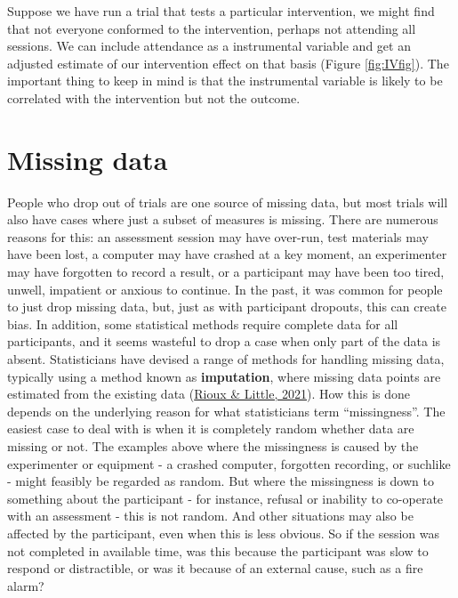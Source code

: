\documentclass{krantz}
\begin{document}
Suppose we have run a trial that tests a particular intervention, we might find that not everyone conformed to the intervention, perhaps not attending all sessions. We can include attendance as a instrumental variable and get an adjusted estimate of our intervention effect on that basis (Figure \ref{fig:IVfig}). The important thing to keep in mind is that the instrumental variable is likely to be correlated with the intervention but not the outcome.

\hypertarget{missing-data}{%
\section{Missing data}\label{missing-data}}

People who drop out of trials are one source of missing data, but most trials will also have cases where just a subset of measures is missing. There are numerous reasons for this: an assessment session may have over-run, test materials may have been lost, a computer may have crashed at a key moment, an experimenter may have forgotten to record a result, or a participant may have been too tired, unwell, impatient or anxious to continue. In the past, it was common for people to just drop missing data, but, just as with participant dropouts, this can create bias. In addition, some statistical methods require complete data for all participants, and it seems wasteful to drop a case when only part of the data is absent. Statisticians have devised a range of methods for handling missing data, typically using a method known as \textbf{imputation}, where missing data points are estimated from the existing data (\protect\hyperlink{ref-rioux2021}{Rioux \& Little, 2021}). How this is done depends on the underlying reason for what statisticians term ``missingness''. The easiest case to deal with is when it is completely random whether data are missing or not. The examples above where the missingness is caused by the experimenter or equipment - a crashed computer, forgotten recording, or suchlike - might feasibly be regarded as random. But where the missingness is down to something about the participant - for instance, refusal or inability to co-operate with an assessment - this is not random. And other situations may also be affected by the participant, even when this is less obvious. So if the session was not completed in available time, was this because the participant was slow to respond or distractible, or was it because of an external cause, such as a fire alarm?\\
\end{document}
